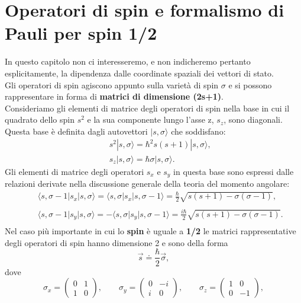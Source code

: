 \documentclass[a4paper,12pt,oneside]{book}
\begin{document}
\section{Operatori di spin e formalismo di Pauli per spin 1/2}
In questo capitolo non ci interesseremo, e non indicheremo pertanto esplicitamente, la dipendenza dalle coordinate spaziali dei vettori di stato.\\
Gli operatori di spin agiscono appunto sulla varietà di spin $\sigma$ e si possono rappresentare in forma di \textbf{matrici di dimensione (2s+1)}.\\
Consideriamo gli elementi di matrice degli operatori di spin nella base in cui il quadrato dello spin $s^{2}$ e la sua componente lungo l'asse z, $s_{z}$, sono diagonali. Questa base è definita dagli autovettori $|s,\sigma\rangle$ che soddisfano:
\begin{eqnarray}
& &s^{2} |s, \sigma\rangle =\hbar^{2}s(s+1)|s, \sigma\rangle ,\\
& &s_{z} |s, \sigma\rangle =\hbar \sigma |s, \sigma\rangle . 
\end{eqnarray}
Gli elementi di matrice degli operatori $s_{x}$ e $s_{y}$ in questa base sono espressi dalle relazioni derivate  nella discussione generale della teoria del momento angolare:
\begin{eqnarray}
& &\langle s, \sigma -1\vert s_{x}\vert s, \sigma\rangle = \langle s, \sigma\vert s_{x}\vert s, \sigma -1\rangle =\frac{\hbar}{2}\sqrt{s(s+1)-\sigma(\sigma-1)} , \nonumber \\
\\
& &\langle s, \sigma -1\vert s_{y}\vert s, \sigma\rangle =- \langle s, \sigma\vert s_{y}\vert s, \sigma -1\rangle =\frac{i\hbar}{2}\sqrt{s(s+1)-\sigma(\sigma-1)} . \nonumber \\
\end{eqnarray}
Nel caso più importante in cui lo \textbf{spin} è uguale a \textbf{1/2} le matrici rappresentative degli operatori di spin hanno dimensione 2 e sono della forma
\begin{equation}
\vec{s}\doteq\frac{\hbar}{2}\vec{\sigma} ,
\end{equation}
dove
\begin{equation}
\sigma_{x}=\begin{pmatrix}
0 & 1 \\
1 & 0
\end{pmatrix}, \qquad \sigma_{y}=\begin{pmatrix}
0 & -i \\
i & 0
\end{pmatrix},\qquad \sigma_{z}=\begin{pmatrix}
1 & 0 \\
0 & -1
\end{pmatrix},
\end{equation}
\end{document}
